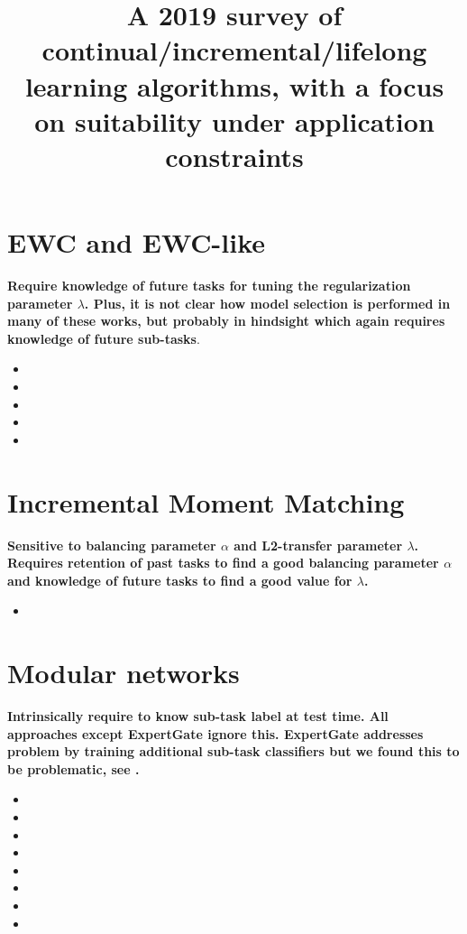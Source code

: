 \documentclass{article}
\title{A 2019 survey of continual/incremental/lifelong learning algorithms, with a focus on suitability under application constraints}
\begin{document}
\maketitle
\section{EWC and EWC-like}
\textbf{Require knowledge of future tasks for tuning the regularization parameter $\lambda$. Plus, it is not clear how model selection is performed in many of these works, but probably in hindsight which again requires knowledge of future sub-tasks}. 
\begin{itemize}
\item {}
\item {}
\item {}
\item {}
\item {}
\end{itemize}

\section{Incremental Moment Matching}
\textbf{Sensitive to balancing parameter $\alpha$ and L2-transfer parameter $\lambda$. Requires retention of past tasks to find a good balancing parameter $\alpha$ and knowledge of future tasks to find a good value for $\lambda$.}
\begin{itemize}
\item {}
\end{itemize}
%
\section{Modular networks}
\textbf{Intrinsically require to know sub-task label at test time. All approaches except ExpertGate \cite{aljundi2017expertGate} ignore this. ExpertGate addresses problem by training additional sub-task classifiers but we found this to be problematic, see \cite{gepperthincremental}.}
\begin{itemize}
\item {}
\item {}
\item {}
\item {}
\item {}
\item {}
\item {}
\item {}
\end{itemize}
\end{document}
